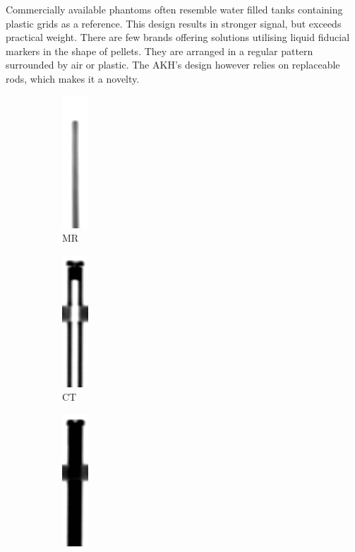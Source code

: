 \documentclass[parskip,bibtotoc,final,twoside=false,titlepage,a4paper,english,12pt,titlepage,a4paper]{scrbook}
\begin{document}
Commercially available phantoms often resemble water filled tanks containing plastic grids as a reference.
This design results in stronger signal, but exceeds practical weight.
There are few brands offering solutions utilising liquid fiducial markers in the shape of pellets.
They are arranged in a regular pattern surrounded by air or plastic.
The AKH's design however relies on replaceable rods, which makes it a novelty.


\begin{figure}[!htb]
\centering
  \begin{subfigure}[b]{0.1\textwidth}
    \includegraphics[scale=1]{slicer3D/full_phantom/sagittal_comparison_mr.png}
    \caption{MR}
    \label{fig:sagittal_comparison_mr}
  \end{subfigure}
  \begin{subfigure}[b]{0.1\textwidth}
    \includegraphics[scale=1]{slicer3D/full_phantom/sagittal_comparison_ct_empty.png}
    \caption{CT}
    \label{fig:sagittal_comparison_ct_empty}
  \end{subfigure}
  \begin{subfigure}[b]{0.1\textwidth}
    \includegraphics[scale=1]{slicer3D/full_phantom/sagittal_comparison_ct.png}

\end{subfigure}
\end{figure}
\end{document}
